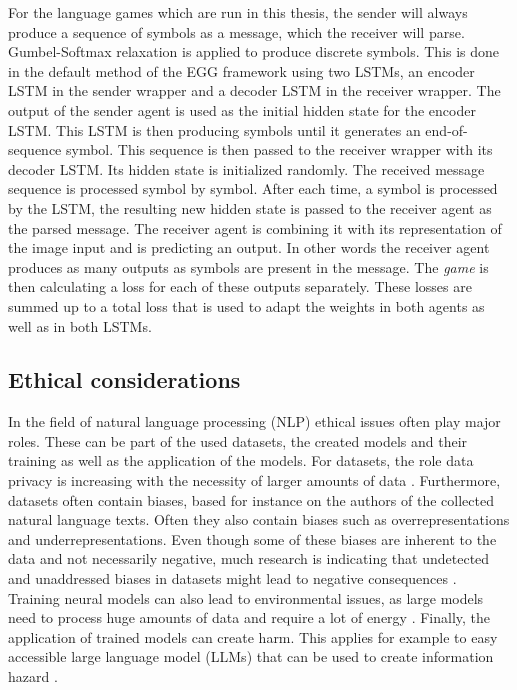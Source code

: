 For the language games which are run in this thesis, the sender will always produce a sequence of symbols as a message, which the receiver will parse.
Gumbel-Softmax relaxation is applied to produce discrete symbols.
This is done in the default method of the EGG framework using two LSTMs, an encoder LSTM in the sender wrapper and a decoder LSTM in the receiver wrapper.
The output of the sender agent is used as the initial hidden state for the encoder LSTM.
This LSTM is then producing symbols until it generates an end-of-sequence symbol.
This sequence is then passed to the receiver wrapper with its decoder LSTM.
Its hidden state is initialized randomly.
The received message sequence is processed symbol by symbol.
After each time, a symbol is processed by the LSTM, the resulting new hidden state is passed to the receiver agent as the parsed message.
The receiver agent is combining it with its representation of the image input and is predicting an output.
In other words the receiver agent produces as many outputs as symbols are present in the message.
The \emph{game} is then calculating a loss for each of these outputs separately.
These losses are summed up to a total loss that is used to adapt the weights in both agents as well as in both LSTMs.

\subsection{Ethical considerations}
In the field of natural language processing (NLP) ethical issues often play major roles.
These can be part of the used datasets, the created models and their training as well as the application of the models.
For datasets, the role data privacy is increasing with the necessity of larger amounts of data \citep{Klymenko2022}.
Furthermore, datasets often contain biases, based for instance on the authors of the collected natural language texts. Often they also contain biases such as overrepresentations and underrepresentations.
Even though some of these biases are inherent to the data and not necessarily negative, much research is indicating that undetected and unaddressed biases in datasets might lead to negative consequences \citep{Shah2020,Field2021,Bender2021}.
Training neural models can also lead to environmental issues, as large models need to process huge amounts of data and require a lot of energy \citep{Bender2021}.
Finally, the application of trained models can create harm.
This applies for example to easy accessible large language model (LLMs) that can be used to create information hazard \citep{Weidinger2022}.

